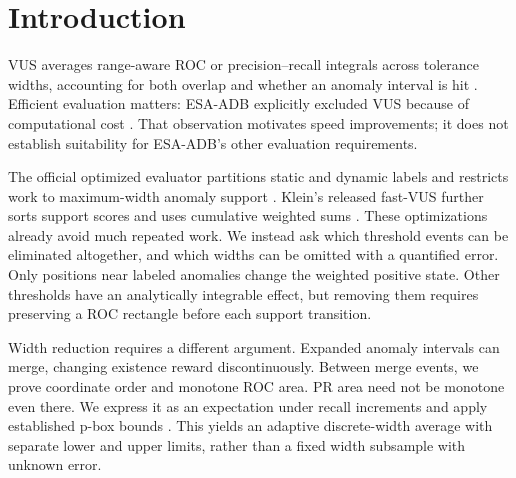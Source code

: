 \section{Introduction}
VUS averages range-aware ROC or precision--recall integrals across tolerance
widths, accounting for both overlap and whether an anomaly interval is hit
\cite{paparrizos2022,boniol2025}. Efficient evaluation matters: ESA-ADB explicitly
excluded VUS because of computational cost \cite{esa2024}. That observation
motivates speed improvements; it does not establish suitability for ESA-ADB's
other evaluation requirements.

The official optimized evaluator partitions static and dynamic labels and
restricts work to maximum-width anomaly support \cite{boniol2025}.
Klein's released fast-VUS further sorts support scores and uses cumulative
weighted sums \cite{klein2026}. These optimizations already avoid much repeated
work. We instead ask which threshold events can be eliminated altogether,
and which widths can be omitted with a quantified error. Only positions near
labeled anomalies change the weighted positive state. Other thresholds have
an analytically integrable effect, but removing them requires preserving a
ROC rectangle before each support transition.

Width reduction requires a different argument. Expanded anomaly intervals
can merge, changing existence reward discontinuously. Between merge events,
we prove coordinate order and monotone ROC area. PR area need not be monotone
even there. We express it as an expectation under recall increments and apply
established p-box bounds \cite{utkin2009,troffaes2011}. This yields an adaptive
discrete-width average with separate lower and upper limits, rather than a
fixed width subsample with unknown error.

